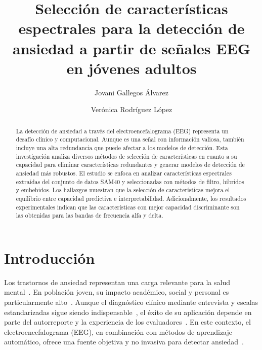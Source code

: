 \documentclass[runningheads]{llncs}
\begin{document}
\title{Selección de características espectrales para la detección de ansiedad a partir de señales EEG en jóvenes adultos}

\author{Jovani Gallegos Álvarez \and Verónica Rodríguez López}
%

%
\maketitle    
\begin{abstract}
La detección de ansiedad a través del electroencefalograma (EEG) representa un desafío clínico y computacional. Aunque es una señal con información valiosa, también incluye una alta redundancia que puede afectar a los modelos de detección. Esta investigación analiza diversos métodos de selección de características en cuanto a su capacidad para eliminar características redundantes y generar modelos de detección de ansiedad más robustos. El estudio se enfoca en analizar características espectrales extraídas del conjunto de datos SAM40 y seleccionadas con métodos de filtro, híbridos y embebidos. Los hallazgos muestran que la selección de características mejora el equilibrio entre capacidad predictiva e interpretabilidad. Adicionalmente, los resultados experimentales indican que las características con mejor capacidad discriminante son las obtenidas para las bandas de frecuencia alfa y delta.

\end{abstract}

\section{Introducción}
Los trastornos de ansiedad representan una carga relevante para la salud mental~\cite{WHOICD11}. En población joven, su impacto académico, social y personal es particularmente alto~\cite{Chand2025}. Aunque el diagnóstico clínico mediante entrevista y escalas estandarizadas sigue siendo indispensable~\cite{Hamilton1959}, el éxito de su aplicación depende en parte del autorreporte y la experiencia de los evaluadores~\cite{SCID2018}. En este contexto, el electroencefalograma (EEG), en combinación con métodos de aprendizaje automático, ofrece una fuente objetiva y no invasiva para detectar ansiedad~\cite{StatPearlsEEG2023}.
\end{document}
